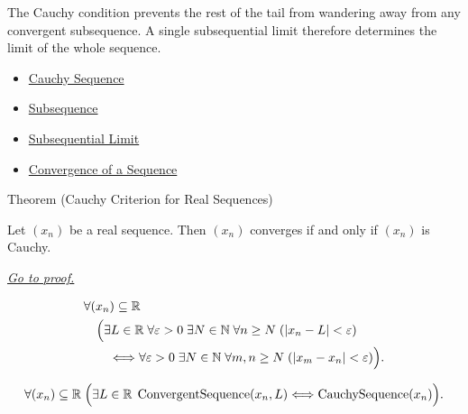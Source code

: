 \begin{remark*}[Interpretation]
The Cauchy condition prevents the rest of the tail from wandering away from
any convergent subsequence. A single subsequential limit therefore determines
the limit of the whole sequence.
\end{remark*}

\begin{dependencies}
\begin{itemize}
  \item \hyperref[def:cauchy-sequence]{Cauchy Sequence}
  \item \hyperref[def:subsequence]{Subsequence}
  \item \hyperref[def:subsequential-limit]{Subsequential Limit}
  \item \hyperref[def:convergent-sequence]{Convergence of a Sequence}
\end{itemize}
\end{dependencies}


\begin{theorembox}{Theorem (Cauchy Criterion for Real Sequences)}
\begin{theorem}
\label{thm:cauchy-criterion-real-sequences}
Let $(x_n)$ be a real sequence. Then $(x_n)$ converges if and only if
$(x_n)$ is Cauchy.

\smallskip
\noindent
\hyperref[prf:cauchy-criterion-real-sequences]{\textit{Go to proof.}}
\end{theorem}
\end{theorembox}

\begin{remark*}
\[
\begin{aligned}
&\forall (x_n)\subseteq\mathbb{R}\\
&\quad
\Bigl(
  \exists L\in\mathbb{R}\;\forall \varepsilon>0\;\exists N\in\mathbb{N}
  \;\forall n\ge N\;( |x_n-L|<\varepsilon )\\
&\qquad\Longleftrightarrow
  \forall \varepsilon>0\;\exists N\in\mathbb{N}\;\forall m,n\ge N
  \;( |x_m-x_n|<\varepsilon )
\Bigr).
\end{aligned}
\]
\end{remark*}

\begin{remark*}
\[
\forall (x_n)\subseteq\mathbb{R}\;
\Bigl(
  \exists L\in\mathbb{R}\;\operatorname{ConvergentSequence}(x_n,L)
  \Longleftrightarrow
  \operatorname{CauchySequence}(x_n)
\Bigr).
\]
\end{remark*}

